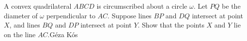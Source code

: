 A convex quadrilateral $ABCD$ is circumscribed about a circle $\omega$. Let $PQ$ be the diameter of $\omega$ perpendicular to $AC$. Suppose lines $BP$ and $DQ$ intersect at point $X$,  and lines $BQ$ and $DP$ intersect at point $Y$. Show that the points $X$ and $Y$ lie on the line $AC$.Géza Kós